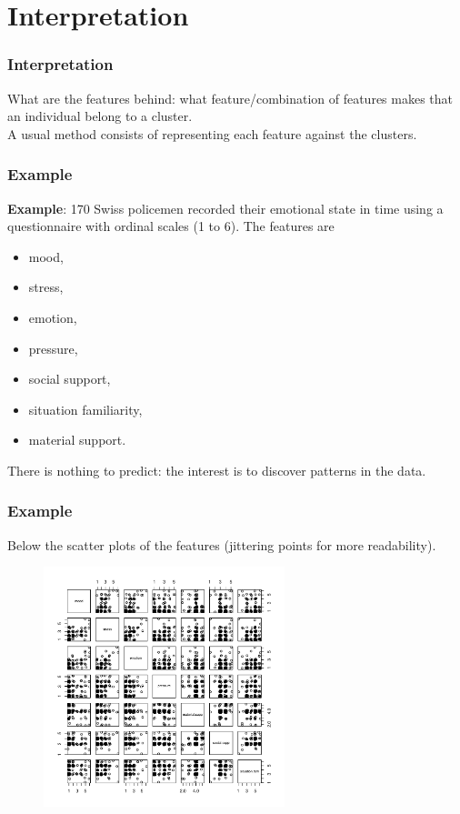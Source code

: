 \section{Interpretation}
\begin{frame}
\frametitle{Interpretation}
What are the features behind: what feature/combination of features makes that an individual belong to a cluster.\\
\vspace{0.3cm}
A usual method consists of representing each feature against the clusters.
\end{frame}
\begin{frame}
\frametitle{Example}
{\bf Example}: 170 Swiss policemen recorded their emotional state in time using a questionnaire with ordinal scales (1 to 6). The features are 
\begin{itemize}
\item mood, 
\item stress, 
\item emotion, 
\item pressure, 
\item social support, 
\item situation familiarity, 
\item material support.
\end{itemize}
There is nothing to predict: the interest is to discover patterns in the data. 
\end{frame}
\begin{frame}
\frametitle{Example}
Below the scatter plots of the features (jittering points for more readability).
\begin{figure}[!h]
\centerline{\includegraphics[width=7cm]{../../Graphs/Polstress-scat-jit.png}}
\end{figure}
\end{frame}
